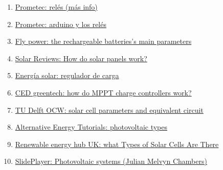 \documentclass[12pt]{article}
\begin{document}
\begin{enumerate}
			\item 
			\label{bib: prometec relés (más info)}
			\href{https://www.prometec.net/mas-sobre-reles/}{Prometec: relés (más info)}
			
			\item 
			\label{bib: prometec relés y arduino}
			\href{https://www.prometec.net/reles/}{Prometec: arduino y los relés}
			
			\item 
			\label{bib: fly power rechargeable battery param}
			\href{https://fly-power.com/en/battery-knowledge/item/2-rechargeable-batteries-s-main-parameters}{Fly power: the rechargeable batteries's main parameters}
			
			\item 
			\label{bib: solar reviews how solar panels work}
			\href{https://www.solarreviews.com/blog/how-do-solar-panels-work}{Solar Reviews: How do solar panels work?}
			
			\item 
			\label{bib: energia solar regulador de carga}
			\href{https://solar-energia.net/energia-solar-fotovoltaica/elementos/instalaciones-autonomas/reguladores-carga}{Energía solar: regulador de carga}
			
			\item 
			\label{bib: CED greentech how mppt works}
			\href{https://www.cedgreentech.com/article/how-do-mppt-charge-controllers-work}{CED greentech: how do MPPT charge controllers work?}
			
			\item 
			\label{bib: TU delft OCW solar cell param}
			\href{https://ocw.tudelft.nl/wp-content/uploads/solar_energy_section_9_1_9_3.pdf}{TU Delft OCW: solar cell parameters and equivalent circuit}
			
			\item 
			\label{bib: alternative energy photovoltaic types}
			\href{https://www.alternative-energy-tutorials.com/photovoltaics/photovoltaic-types.html}{Alternative Energy Tutorials: photovoltaic types}
			
			\item 
			\label{bib: renewable energy hub main types photo cells}
			\href{https://www.renewableenergyhub.co.uk/main/solar-panels/types-of-solar-cell/}{Renewable energy hub UK: what Types of Solar Cells Are There}
			
			\item 
			\label{bib: SlidePlayer Photovoltaic systems}
			\href{https://slideplayer.com/slide/9144319/}{SlidePlayer: Photovoltaic systems (Julian Melvyn Chambers)}
			

\end{enumerate}
\end{document}
